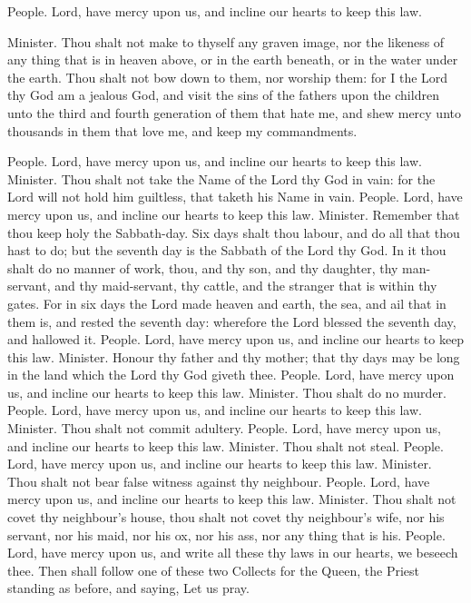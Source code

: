 People. Lord, have mercy upon us, and incline our hearts to keep this law.

Minister. Thou shalt not make to thyself any graven image, nor the likeness of any thing that is in heaven above, or in the earth beneath, or in the water under the earth. Thou shalt not bow down to them, nor worship them: for I the Lord thy God am a jealous God, and visit the sins of the fathers upon the children unto the third and fourth generation of them that hate me, and shew mercy unto thousands in them that love me, and keep my commandments.

People. Lord, have mercy upon us, and incline our hearts to keep this law.
    Minister. Thou shalt not take the Name of the Lord thy God in vain: for the Lord will not hold him guiltless, that taketh his Name in vain.
    People. Lord, have mercy upon us, and incline our hearts to keep this law.
    Minister. Remember that thou keep holy the Sabbath-day. Six days shalt thou labour, and do all that thou hast to do; but the seventh day is the Sabbath of the Lord thy God. In it thou shalt do no manner of work, thou, and thy son, and thy daughter, thy man-servant, and thy maid-servant, thy cattle, and the stranger that is within thy gates. For in six days the Lord made heaven and earth, the sea, and ail that in them is, and rested the seventh day: wherefore the Lord blessed the seventh day, and hallowed it.
    People. Lord, have mercy upon us, and incline our hearts to keep this law.
    Minister. Honour thy father and thy mother; that thy days may be long in the land which the Lord thy God giveth thee.
    People. Lord, have mercy upon us, and incline our hearts to keep this law.
    Minister. Thou shalt do no murder.
    People. Lord, have mercy upon us, and incline our hearts to keep this law.
    Minister. Thou shalt not commit adultery.
    People. Lord, have mercy upon us, and incline our hearts to keep this law.
    Minister. Thou shalt not steal.
    People. Lord, have mercy upon us, and incline our hearts to keep this law.
    Minister. Thou shalt not bear false witness against thy neighbour.
    People. Lord, have mercy upon us, and incline our hearts to keep this law.
    Minister. Thou shalt not covet thy neighbour's house, thou shalt not covet thy neighbour's wife, nor his servant, nor his maid, nor his ox, nor his ass, nor any thing that is his.
    People. Lord, have mercy upon us, and write all these thy laws in our hearts, we beseech thee.
Then shall follow one of these two Collects for the Queen, the Priest standing as before, and saying,
Let us pray.
